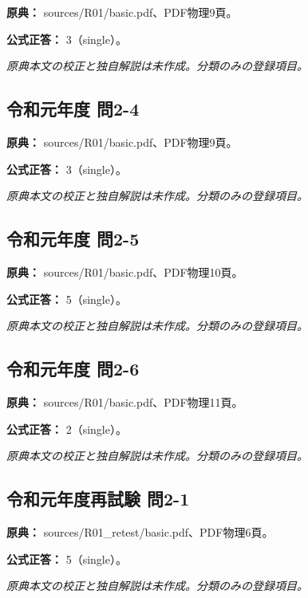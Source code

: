 \noindent\textbf{原典：} sources/R01/basic.pdf、PDF物理9頁。

\textbf{公式正答：} 3（single）。

\par\textit{原典本文の校正と独自解説は未作成。分類のみの登録項目。}

\subsection{令和元年度 問2-4}
\label{q:r01-reg-basic-2-4}

\noindent\textbf{原典：} sources/R01/basic.pdf、PDF物理9頁。

\textbf{公式正答：} 3（single）。

\par\textit{原典本文の校正と独自解説は未作成。分類のみの登録項目。}

\subsection{令和元年度 問2-5}
\label{q:r01-reg-basic-2-5}

\noindent\textbf{原典：} sources/R01/basic.pdf、PDF物理10頁。

\textbf{公式正答：} 5（single）。

\par\textit{原典本文の校正と独自解説は未作成。分類のみの登録項目。}

\subsection{令和元年度 問2-6}
\label{q:r01-reg-basic-2-6}

\noindent\textbf{原典：} sources/R01/basic.pdf、PDF物理11頁。

\textbf{公式正答：} 2（single）。

\par\textit{原典本文の校正と独自解説は未作成。分類のみの登録項目。}

\subsection{令和元年度再試験 問2-1}
\label{q:r01-ret-basic-2-1}

\noindent\textbf{原典：} sources/R01\_retest/basic.pdf、PDF物理6頁。

\textbf{公式正答：} 5（single）。

\par\textit{原典本文の校正と独自解説は未作成。分類のみの登録項目。}

